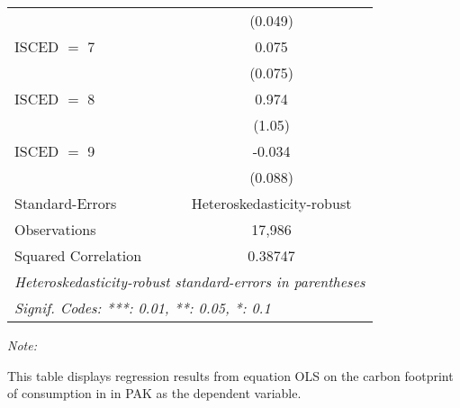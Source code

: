 \begin{table}[htbp!]
\begin{adjustbox}{width = 1\textwidth, max height = 0.95\textheight, center}
\begin{threeparttable}[b]
\begin{tabular}{lc}
                                & (0.049)\\   
            ISCED $=$ 7         & 0.075\\   
                                & (0.075)\\   
            ISCED $=$ 8         & 0.974\\   
                                & (1.05)\\   
            ISCED $=$ 9         & -0.034\\   
                                & (0.088)\\   
            \midrule 
            Standard-Errors     & Heteroskedasticity-robust \\   
            Observations        & 17,986\\  
            Squared Correlation & 0.38747\\  
            \midrule \midrule
            \multicolumn{2}{l}{\emph{Heteroskedasticity-robust standard-errors in parentheses}}\\
            \multicolumn{2}{l}{\emph{Signif. Codes: ***: 0.01, **: 0.05, *: 0.1}}\\
         \end{tabular}
         
         \begin{tablenotes}\item \medskip \textit{Note:}
            \item This table displays regression results from equation OLS on the carbon footprint of consumption in  in PAK as the dependent variable.  
         \end{tablenotes}
      \end{threeparttable}
   \end{adjustbox}
\end{table}


